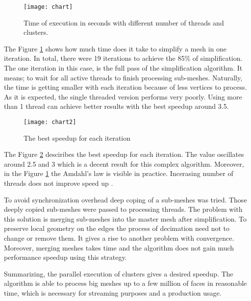 \begin{figure}[h!]
  \begin{center}
    \texttt{[image: chart]}
    \caption{Time of execution in seconds with different number of threads and clusters.}
    \label{fig:execution_time}
  \end{center}
\end{figure}

The Figure \ref{fig:execution_time} shows how much time does it take to simplify a mesh in one iteration. In total, there were 19 iterations to achieve the 85\% of simplification. The one iteration in this case, is the full pass of the simplification algorithm. It means; to wait for all active threads to finish processing sub-meshes. Naturally, the time is getting smaller with each iteration because of less vertices to process. As it is expected, the single threaded version performs very poorly. Using more than 1 thread can achieve better results with the best speedup around 3.5.

\begin{figure}[H]
  \begin{center}
    \texttt{[image: chart2]}
    \caption{The best speedup for each iteration}
    \label{fig:speedup}
  \end{center}
\end{figure}

The Figure \ref{fig:speedup} desciribes the best speedup for each iteration. The value oscillates around 2.5 and 3 which is a decent result for this complex algorithm. Moreover, in the Figure \ref{fig:execution_time} the Amdahl's law is visible in practice. Incerasing number of threads does not improve speed up \cite{amdahl67}.

To avoid synchronization overhead deep coping of a sub-meshes was tried. Those deeply copied sub-meshes were passed to processing threads. The problem with this solution is merging sub-meshes into the master mesh after simplification. To preserve local geometry on the edges the process of decimation need not to change or remove them. It gives a rise to another problem with convergence. Moreover, merging meshes takes time and the algorithm does not gain much performance speedup using this strategy.

Summarizing, the parallel execution of clusters gives a desired speedup. The algorithm is able to process big meshes up to a few million of faces in reasonable time, which is necessary for streaming purposes and a production usage.

